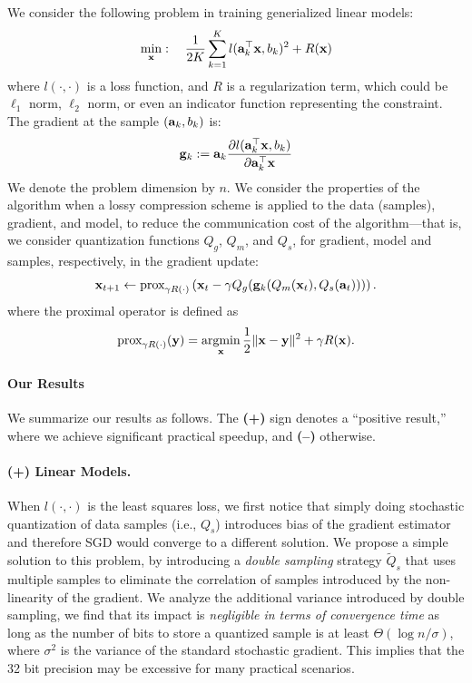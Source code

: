 \documentclass{article}
\renewcommand{\vec}[1]{\mathbf{#1}}
\def\a{{\bf a}}
\def\g{{\bf g}}
\def\x{{\bf x}}
\def\y{{\bf y}}
\DeclareMathOperator*{\argmin}{argmin}
\begin{document}
We consider the following problem in training generialized linear models: 
\begin{align}
\min_{\x}:\quad {1\over 2K}\sum_{k=1}^K l(\a_k^\top \x, b_k)^2 + R(\x)
\label{eqn:leastsquares}
\end{align}
where $l(\cdot,\cdot)$ is a loss function, and $R$ is a regularization term, which could be $\ell_1$ norm, $\ell_2$ norm, or even an indicator function representing the constraint. 
The gradient at the sample $(\a_k, b_k)$ is: 
\[
\g_k := \a_k \frac{\partial l(\a_k^\top \x, b_k)}{\partial \a_k^\top \x} 
\]
We denote the problem dimension by $n$. 
We consider the properties of the algorithm when a lossy compression scheme is applied to the data (samples), 
gradient, and model, to reduce the communication cost of the algorithm---that is, we consider quantization functions $Q_g$, $Q_m$, and $Q_s$, for gradient, model and samples, respectively, in the gradient update:
\begin{align}
\x_{t + 1} \leftarrow \text{prox}_{\gamma R(\cdot)}\left(\x_t - \gamma Q_g(\g_k (Q_m(\x_t), Q_s(\vec{a}_t)))\right).
\label{eq:proxupdate}
\end{align}
where the proximal operator is defined as
\[
\text{prox}_{\gamma R(\cdot)}(\y) =\argmin_{\x} {1\over 2}\|\x-\y\|^2 + \gamma R(\x).
\]

\vspace{-1.5em}
\paragraph{Our Results} We summarize our results as follows. The {\bf (+)}
sign denotes a ``positive result,'' where we achieve
significant practical speedup, and {\bf (--)} otherwise.

\vspace{-1em}
\paragraph{(+) Linear Models.} When $l(\cdot,\cdot)$ is 
the least squares loss, we first notice that
simply doing stochastic quantization of data samples  
(i.e., $Q_s$) introduces bias of the gradient
estimator and therefore SGD would converge
to a different solution. We propose a simple
solution to this problem, by introducing a
{\em double sampling} strategy
$\tilde{Q}_s$ that uses multiple samples to
eliminate the correlation of samples introduced
by the non-linearity of the gradient. We
analyze the additional variance introduced
by double sampling, we find that its impact is \emph{negligible in terms of convergence time} as long as the 
number of bits to store a quantized sample is at least $\Theta( \log n / \sigma )$, 
where $\sigma^2$ is the variance of the standard stochastic gradient. 
This implies that the 32 bit precision may be excessive for many practical scenarios. 
\end{document}
